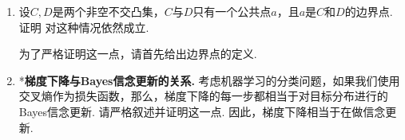 \begin{enumerate}[wide, labelindent=0pt]
    \item \label{exercise:separation-hyperplane-extension} 设$C,D$是两个非空不交凸集，$C$与$D$只有一个公共点$a$，且$a$是$C$和$D$的边界点. 证明 对这种情况依然成立.
    \begin{hint}
        为了严格证明这一点，请首先给出边界点的定义.
    \end{hint}
    
    \item *\textbf{梯度下降与Bayes信念更新的关系. }考虑机器学习的分类问题，如果我们使用交叉熵作为损失函数，那么，梯度下降的每一步都相当于对目标分布进行的Bayes信念更新. 请严格叙述并证明这一点. 因此，梯度下降相当于在做信念更新. 
\end{enumerate}
